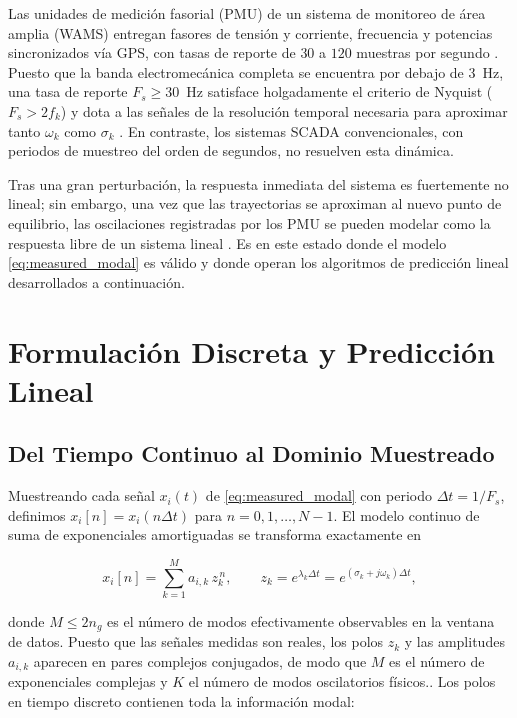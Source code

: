 Las unidades de medición fasorial (PMU) de un sistema de monitoreo de área
amplia (WAMS) entregan fasores de tensión y corriente, frecuencia y
potencias sincronizados vía GPS, con tasas de reporte de $30$ a $120$
muestras por segundo \cite{sauer2017}. Puesto que la banda electromecánica
completa se encuentra por debajo de $3$~Hz, una tasa de reporte
$F_s \ge 30$~Hz satisface holgadamente el criterio de Nyquist
($F_s > 2 f_k$) y dota a las señales de la resolución
temporal necesaria para aproximar tanto $\omega_k$ como $\sigma_k$
\cite{sauer2017}. En contraste, los sistemas SCADA convencionales, con
periodos de muestreo del orden de segundos, no resuelven esta dinámica.

Tras una gran perturbación, la respuesta inmediata del sistema es
fuertemente no lineal; sin embargo, una vez que las trayectorias se
aproximan al nuevo punto de equilibrio, las oscilaciones registradas por los 
PMU se pueden modelar como la respuesta libre de un sistema lineal \cite{sauer2017}. 
Es en este estado donde el modelo \eqref{eq:measured_modal} es válido 
y donde operan los algoritmos de predicción lineal desarrollados a continuación.

\section{Formulación Discreta y Predicción Lineal}

\subsection{Del Tiempo Continuo al Dominio Muestreado}

Muestreando cada señal $x_i(t)$ de \eqref{eq:measured_modal} con periodo
$\Delta t = 1/F_s$, definimos $x_i[n] = x_i(n\Delta t)$ para
$n = 0,1,\dots,N-1$. El modelo continuo de suma de exponenciales
amortiguadas se transforma exactamente en

\begin{equation}
    x_i[n] = \sum_{k=1}^{M} a_{i,k}\, z_k^{\,n}, \qquad
    z_k = e^{\lambda_k \Delta t} = e^{(\sigma_k + j\omega_k)\Delta t},
    \label{eq:discrete}
\end{equation}

donde $M \le 2n_g$ es el número de modos efectivamente observables en la
ventana de datos. Puesto que las señales medidas son reales, los polos
$z_k$ y las amplitudes $a_{i,k}$ aparecen en pares complejos conjugados,
de modo que $M$ es el número de exponenciales complejas y $K$ el número de
 modos oscilatorios físicos.. Los polos en tiempo discreto contienen toda 
 la información modal:

